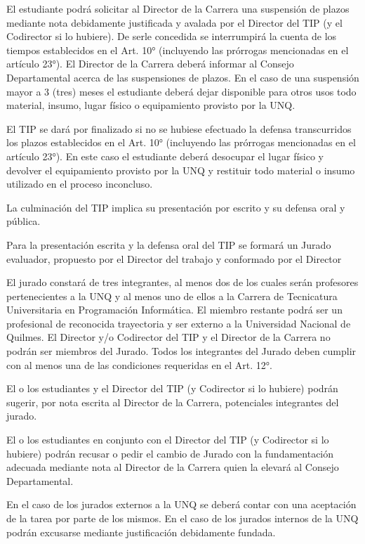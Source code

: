\articulo El estudiante podrá solicitar al Director de la Carrera una
suspensión de plazos mediante nota debidamente justificada y avalada por el Director
del TIP (y el Codirector si lo hubiere). De serle concedida se interrumpirá la cuenta de
los tiempos establecidos en el Art. 10° (incluyendo las prórrogas mencionadas en el
artículo 23°). El Director de la Carrera deberá informar al Consejo Departamental
acerca de las suspensiones de plazos. En el caso de una suspensión mayor a 3 (tres)
meses el estudiante deberá dejar disponible para otros usos todo material, insumo,
lugar físico o equipamiento provisto por la UNQ.

\articulo El TIP se dará por finalizado si no se hubiese efectuado la
defensa transcurridos los plazos establecidos en el Art. 10° (incluyendo las prórrogas
mencionadas en el artículo 23°). En este caso el estudiante deberá desocupar el lugar
físico y devolver el equipamiento provisto por la UNQ y restituir todo material o insumo
utilizado en el proceso inconcluso.


\articulo La culminación del TIP implica su presentación por escrito y su
defensa oral y pública.

\articulo Para la presentación escrita y la defensa oral del TIP se formará
un Jurado evaluador, propuesto por el Director del trabajo y conformado por el Director

\articulo El jurado constará de tres integrantes, al menos dos de los cuales
serán profesores pertenecientes a la UNQ y al menos uno de ellos a la Carrera de
Tecnicatura Universitaria en Programación Informática. El miembro restante podrá ser
un profesional de reconocida trayectoria y ser externo a la Universidad Nacional de
Quilmes. El Director y/o Codirector del TIP y el Director de la Carrera no podrán ser
miembros del Jurado. Todos los integrantes del Jurado deben cumplir con al menos
una de las condiciones requeridas en el Art. 12°.

\articulo El o los estudiantes y el Director del TIP (y Codirector si lo
hubiere) podrán sugerir, por nota escrita al Director de la Carrera, potenciales
integrantes del jurado.

\articulo El o los estudiantes en conjunto con el Director del TIP (y
Codirector si lo hubiere) podrán recusar o pedir el cambio de Jurado con la
fundamentación adecuada mediante nota al Director de la Carrera quien la elevará al
Consejo Departamental.

\articulo En el caso de los jurados externos a la UNQ se deberá contar
con una aceptación de la tarea por parte de los mismos. En el caso de los jurados
internos de la UNQ podrán excusarse mediante justificación debidamente fundada. 

